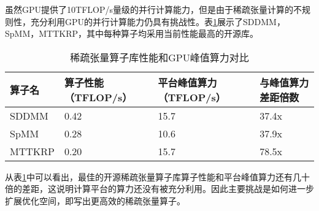 虽然GPU提供了10TFLOP/s量级的并行计算能力，但是由于稀疏张量计算的不规则性，充分利用GPU的并行计算能力仍具有挑战性。表\ref{tab:motivation-1}展示了SDDMM\cite{yu2021exploiting}，SpMM\cite{huang2020ge}，MTTKRP\cite{nisa2019mttkrp}，其中每种算子均采用当前性能最高的开源库。
\begin{table}
  \centering
  \caption{稀疏张量算子库性能和GPU峰值算力对比}
  \begin{tabular}{llll}
    \toprule
    算子名  & 算子性能（TFLOP/s） & 平台峰值算力（TFLOP/s） & 与峰值算力差距倍数   \\
    \midrule
    SDDMM  & 0.42 & 15.7 & 37.4x \\
    SpMM   & 0.28 & 10.6 & 37.9x \\
    MTTKRP & 0.20 & 15.7 & 78.5x \\
    \bottomrule
  \end{tabular}
  \label{tab:motivation-1}
\end{table}
从表\ref{tab:motivation-1}中可以看出，最佳的开源稀疏张量算子库算子性能和平台峰值算力还有几十倍的差距，这说明计算平台的算力还没有被充分利用。因此主要挑战是如何进一步扩展优化空间，即写出更高效的稀疏张量算子。

